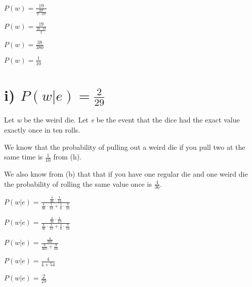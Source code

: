 \documentclass[11pt, oneside]{article}   	%
\begin{document}
$
P(w) = \frac{19}{\frac{20!}{2! \cdot 18!}}
$

$
P(w) = \frac{19}{\frac{20 \cdot 19}{2}}
$

$
P(w) = \frac{38}{380}
$

$
P(w) = \frac{1}{10}
$

\section*{i) $P(w | e) = \frac{2}{29}$}

Let \textit{w} be the weird die.
Let \textit{e} be the event that the dice had the exact value exactly once in ten rolls.

We know that the probability of pulling out a weird die if you pull two at the same time is $\frac{1}{10}$ from (h).

We also know from (b) that that if you have one regular die and one weird die the probability of rolling the same value once is $\frac{4}{36}$.

$
P(w | e) = \frac{\frac{4}{36} \cdot \frac{1}{10}}{\frac{4}{36} \cdot \frac{1}{10} + \frac{1}{6} \cdot \frac{9}{10}}
$

$
P(w | e) = \frac{\frac{4}{36} \cdot \frac{1}{10}}{\frac{4}{36} \cdot \frac{1}{10} + \frac{1}{6} \cdot \frac{9}{10}}
$

$
P(w | e) = \frac{\frac{4}{360}}{\frac{4}{360} + \frac{9}{60}}
$

$
P(w | e) = \frac{4}{4 + 54}
$

$
P(w | e) = \frac{2}{29}
$
\end{document}
